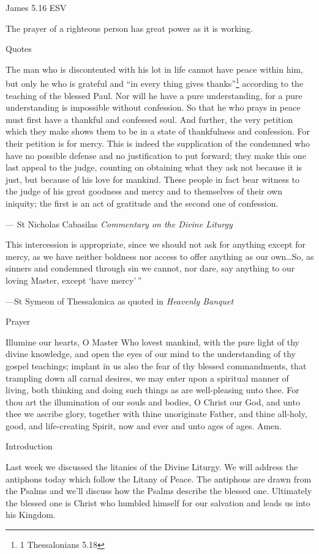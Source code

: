 \documentclass[
]{article}
\begin{document}
James 5.16 ESV

The prayer of a righteous person has great power as it is working.

Quotes

The man who is discontented with his lot in life cannot have peace
within him, but only he who is grateful and ``in every thing gives
thanks''\footnote{1 Thessalonians 5.18} according to the teaching of the
blessed Paul. Nor will he have a pure understanding, for a pure
understanding is impossible without confession. So that he who prays in
peace must first have a thankful and confessed soul. And further, the
very petition which they make shows them to be in a state of
thankfulness and confession. For their petition is for mercy. This is
indeed the supplication of the condemned who have no possible defense
and no justification to put forward; they make this one last appeal to
the judge, counting on obtaining what they ask not because it is just,
but because of his love for mankind. These people in fact bear witness
to the judge of his great goodness and mercy and to themselves of their
own iniquity; the first is an act of gratitude and the second one of
confession.

--- St Nicholas Cabasilas \emph{Commentary on the Divine Liturgy}

This intercession is appropriate, since we should not ask for anything
except for mercy, as we have neither boldness nor access to offer
anything as our own\ldots So, as sinners and condemned through sin we
cannot, nor dare, say anything to our loving Master, except `have
mercy'\,''

---St Symeon of Thessalonica as quoted in \emph{Heavenly Banquet}

Prayer

Illumine our hearts, O Master Who lovest mankind, with the pure light of
thy divine knowledge, and open the eyes of our mind to the understanding
of thy gospel teachings; implant in us also the fear of thy blessed
commandments, that trampling down all carnal desires, we may enter upon
a spiritual manner of living, both thinking and doing such things as are
well-pleasing unto thee. For thou art the illumination of our souls and
bodies, O Christ our God, and unto thee we ascribe glory, together with
thine unoriginate Father, and thine all-holy, good, and life-creating
Spirit, now and ever and unto ages of ages. Amen.

Introduction

Last week we discussed the litanies of the Divine Liturgy. We will
address the antiphons today which follow the Litany of Peace. The
antiphons are drawn from the Psalms and we'll discuss how the Psalms
describe the blessed one. Ultimately the blessed one is Christ who
humbled himself for our salvation and leads us into his Kingdom.
\end{document}
